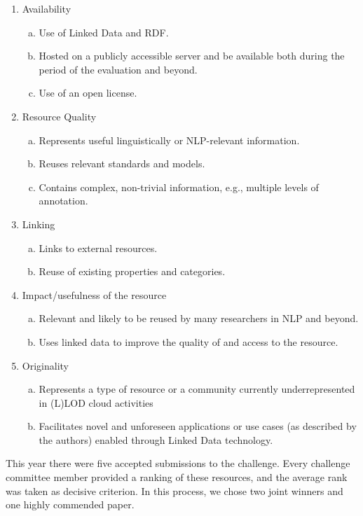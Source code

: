 \begin{enumerate}[1.]
\item Availability
	\begin{enumerate}[a.]
	\item Use of Linked Data and RDF.
	\item Hosted on a publicly accessible server and be available both during the period of the evaluation and beyond.
	\item Use of an open license.
	\end{enumerate}
\item Resource Quality
	\begin{enumerate}[a.]
	\item Represents useful linguistically or NLP-relevant information.
	\item Reuses relevant standards and models.
	\item Contains complex, non-trivial information, e.g., multiple levels  of annotation.
	\end{enumerate}
\item Linking
	\begin{enumerate}[a.]
	\item Links to external resources.
	\item Reuse of existing properties and categories.
	\end{enumerate}
\item Impact/usefulness of the resource
	\begin{enumerate}[a.]
	\item Relevant and likely to be reused by many researchers in NLP and beyond.
	\item Uses linked data to improve the quality of and access to the resource.
	\end{enumerate}
\item Originality
	\begin{enumerate}[a.]
	\item Represents a type of resource or a community currently underrepresented in (L)LOD cloud activities
	\item Facilitates novel and unforeseen applications or use cases (as described by the authors) enabled through Linked Data technology.
	\end{enumerate}
\end{enumerate}

\noindent	
This year there were five accepted submissions to the challenge. 
Every challenge committee member provided a ranking of these resources, and the average rank was taken as decisive criterion.
In this process, we chose two joint winners and one highly commended paper. 

